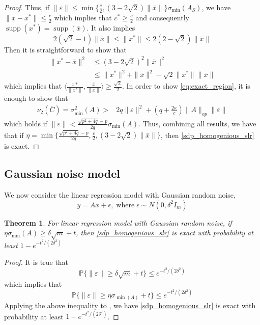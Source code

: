 \documentclass[11pt]{amsart}
\theoremstyle{plain}
\newtheorem{thm}{Theorem}[section]
\theoremstyle{definition}
\theoremstyle{remark}
\DeclareMathOperator{\supp}{supp}
\begin{document}
\begin{proof}
		Thus, if \(\|\varepsilon\|\leq \min\{\tfrac{c}{2},(3-2\sqrt{2})\|\bar x\|\}\sigma_{\min}(A_S)\), we have \(\|x-x^*\|\leq \frac{c}{2}\) which implies that  \(c^* \geq \tfrac{c}{2}\) and consequently \(\supp(x^*)=\supp(\bar x)\). It also implies 
		\[
		2(\sqrt{2}-1)\|\bar x\|\leq\|x^*\|\leq 2(2- \sqrt{2})\|\bar x\|
		\]
		Then it is straightforward to show that
		\begin{equation}
			\begin{split}
				\|x^*-\bar x\|^2 &\leq (3-2\sqrt{2})^2\|\bar x\|^2\\
				&\leq \|x^*\|^2 + \|\bar x\|^2 -\sqrt{2}\|x^*\|\|\bar x\|
			\end{split}
		\end{equation}
		which implies that \(\langle\tfrac{x*}{\|x^*\|},\tfrac{\bar x}{\|\bar x\|}\rangle \geq \tfrac{\sqrt{2}}{2}\).
		In order to show \eqref{eq:exact_region}, it is enough to show that
		\begin{equation}
			\begin{split}
				\nu_2(\bar C) =\sigma^2_{\min}(A) >& 2q\|\varepsilon\|^2 + (q+\tfrac{2\kappa}{c})\|A\|_{op}\|\varepsilon\|
			\end{split}
		\end{equation}
		which holds if \(\|\varepsilon\| < \tfrac{\sqrt{p^2 + 4q}-p}{2q} \sigma_{\min}(A)\). Thus, combining all results, we have that if \(\eta =\min\big\{\tfrac{\sqrt{p^2 + 4q}-p}{2q}, \tfrac{c}{2}, (3-2\sqrt{2})\|\bar x\| \big\}\), then \eqref{sdp_homogenious_slr} is exact.
	\end{proof}
	
	\subsection{Gaussian noise model}
	
	We now consider the linear regression model with Gaussian random noise,
	\[
	y = A \bar x + \epsilon, \;\text{where}\; \epsilon \sim N(0, \delta^2 I_m)
	\]
	
	\begin{thm}
		For linear regression model with Gaussian random noise, if \( \eta \sigma_{\min}(A) \geq \delta\sqrt{m} + t\), then \eqref{sdp_homogenious_slr} is exact with probability at least \(1 - e^{-t^2/(2\delta^2)}\)
	\end{thm}
	\begin{proof}
		It is true that 
		\[
		\mathbb{P}\{\|\varepsilon\| \geq \delta\sqrt{m} + t\} \leq  e^{-t^2/(2\delta^2)}
		\]
		which implies that
		\[
		\mathbb{P}\{\|\varepsilon\| \geq \eta \sigma_{\min(A)}+t\} \leq  e^{-t^2/(2\delta^2)}
		\]
		Applying the above inequality to , we have \eqref{sdp_homogenious_slr} is exact with probability at least \(1-  e^{-t^2/(2\delta^2)}\).
	\end{proof}
	
\end{document}
